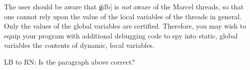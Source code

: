 The user should be aware that \|gdb| is \emph{not} aware of the Marcel
threads, so that one cannot rely upon the value of the local variables
of the threads in general. Only the values of the global variables are
certified. Therefore, you may wish to equip your program with
additional debugging code to spy into static, global variables the
contents of dynamic, local variables.

\begin{note}
  LB to RN: Is the paragraph above correct?
\end{note}
